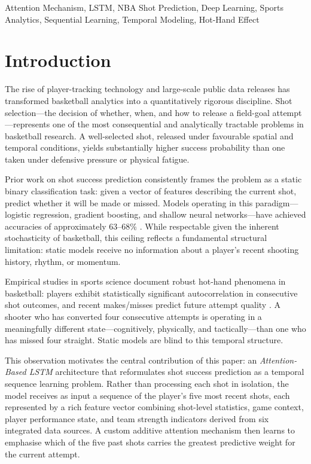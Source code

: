 \documentclass[conference]{IEEEtran}
\begin{document}
\begin{IEEEkeywords}
Attention Mechanism, LSTM, NBA Shot Prediction, Deep Learning, Sports
Analytics, Sequential Learning, Temporal Modeling, Hot-Hand Effect
\end{IEEEkeywords}

\section{Introduction}

The rise of player-tracking technology and large-scale public data
releases has transformed basketball analytics into a quantitatively
rigorous discipline.  Shot selection—the decision of whether, when, and
how to release a field-goal attempt—represents one of the most
consequential and analytically tractable problems in basketball research.
A well-selected shot, released under favourable spatial and temporal
conditions, yields substantially higher success probability than one
taken under defensive pressure or physical fatigue.

Prior work on shot success prediction consistently frames the problem as
a static binary classification task: given a vector of features
describing the current shot, predict whether it will be made or missed.
Models operating in this paradigm—logistic regression, gradient boosting,
and shallow neural networks—have achieved accuracies of approximately
63–68\% \cite{b1,b2,b3}.  While respectable given the inherent
stochasticity of basketball, this ceiling reflects a fundamental
structural limitation: static models receive no information about a
player's recent shooting history, rhythm, or momentum.

Empirical studies in sports science document robust hot-hand phenomena in
basketball: players exhibit statistically significant autocorrelation in
consecutive shot outcomes, and recent makes/misses predict future attempt
quality \cite{b4}.  A shooter who has converted four consecutive
attempts is operating in a meaningfully different state—cognitively,
physically, and tactically—than one who has missed four straight.  Static
models are blind to this temporal structure.

This observation motivates the central contribution of this paper: an
\textit{Attention-Based LSTM} architecture that reformulates shot success
prediction as a temporal sequence learning problem.  Rather than
processing each shot in isolation, the model receives as input a sequence
of the player's five most recent shots, each represented by a rich
feature vector combining shot-level statistics, game context, player
performance state, and team strength indicators derived from six
integrated data sources.  A custom additive attention mechanism then
learns to emphasise which of the five past shots carries the greatest
predictive weight for the current attempt.
\end{document}
